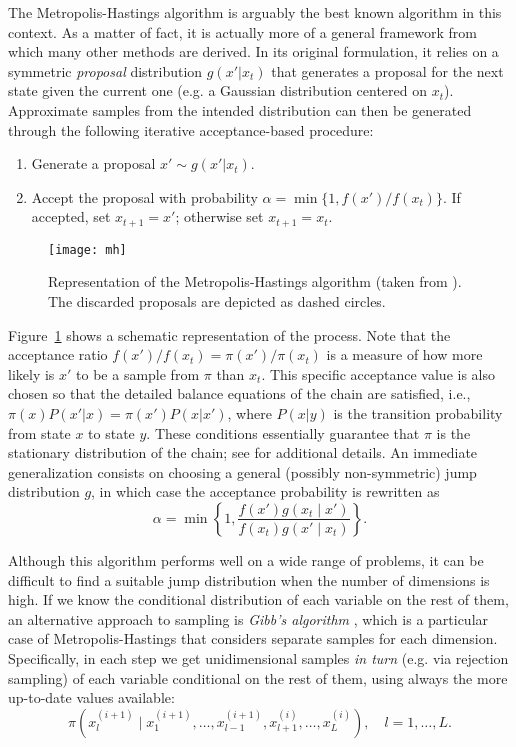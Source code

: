 The Metropolis-Hastings algorithm \citep{metropolis1953equation} is arguably the best known algorithm in this context. As a matter of fact, it is actually more of a general framework from which many other methods are derived. In its original formulation, it relies on a symmetric \textit{proposal} distribution \(g(x'|x_t)\) that generates a proposal for the next state given the current one (e.g. a Gaussian distribution centered on \(x_t\)). Approximate samples from the intended distribution can then be generated through the following iterative acceptance-based procedure:
\begin{enumerate}[1.]
  \item Generate a proposal \(x' \sim g(x'|x_t)\).
  \item Accept the proposal with probability \(\alpha=\min\{1, f(x')/f(x_t)\}\). If accepted, set \(x_{t+1}=x'\); otherwise set \(x_{t+1}=x_t\).
\end{enumerate}
 \begin{figure}[ht!]
   \centering
   \texttt{[image: mh]}
   \caption{Representation of the Metropolis-Hastings algorithm (taken from \citet{jaewook2015metamodel}). The discarded proposals are depicted as dashed circles.}\label{fig:mh}
 \end{figure}
Figure~\ref{fig:mh} shows a schematic representation of the process. Note that the acceptance ratio \(f(x')/f(x_t)=\pi(x')/\pi(x_t)\) is a measure of how more likely is \(x'\) to be a sample from \(\pi\) than \(x_t\). This specific acceptance value is also chosen so that the detailed balance equations of the chain are satisfied, i.e., \(\pi(x)P(x'|x)=\pi(x')P(x|x')\), where \(P(x|y)\) is the transition probability from state \(x\) to state \(y\). These conditions essentially guarantee that \(\pi\) is the stationary distribution of the chain; see \citet{robert1999monte} for additional details. An immediate generalization consists on choosing a general (possibly non-symmetric) jump distribution \(g\), in which case the acceptance probability is rewritten as
\[
\alpha = \min\left\{1, \frac{f(x')g(x_t \mid x')}{f(x_t)g(x'\mid x_t)}\right\}.
\]

Although this algorithm performs well on a wide range of problems, it can be difficult to find a suitable jump distribution when the number of dimensions is high. If we know the conditional distribution of each variable on the rest of them, an alternative approach to sampling is \textit{Gibb's algorithm} \citep{geman1984stochastic}, which is a particular case of Metropolis-Hastings that considers separate samples for each dimension. Specifically, in each step we get unidimensional samples \textit{in turn} (e.g. via rejection sampling) of each variable conditional on the rest of them, using always the more up-to-date values available:
\[
\pi(x_l^{(i+1)} \mid x_{1}^{(i+1)}, \dots, x_{l-1}^{(i+1)}, x_{l+1}^{(i)}, \dots, x_L^{(i)}), \quad l=1,\dots,L.
\]


